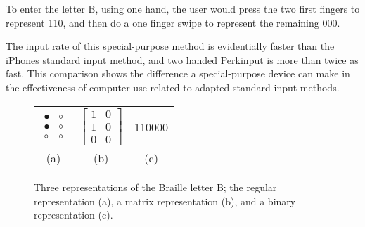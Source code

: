 To enter the letter B, using one hand, the user would press the two first fingers to represent 110, and then do a one finger swipe to represent the remaining 000.

The input rate of this special-purpose method is evidentially faster than the iPhones standard input method\cite{azenkot}, and two handed Perkinput is more than twice as fast. This comparison shows the difference a special-purpose device can make in the effectiveness of computer use related to adapted standard input methods. 

\begin{figure}[h!]
\centering

\begin{tabular}{c c c}

$
\begin{array}{cc}
\bullet & \circ \\
\bullet & \circ \\
\circ & \circ \end{array}
$

&

$
\left[ \begin{array}{cc}
1 & 0 \\
1 & 0 \\
0 & 0 \end{array} \right]
$ 

&

110000 \\

(a) & (b) & (c)

\end{tabular}


\caption{Three representations of the Braille letter B; the regular representation (a), a matrix representation (b), and a binary representation (c).}
\label{fig:brailleexample}


\end{figure}

